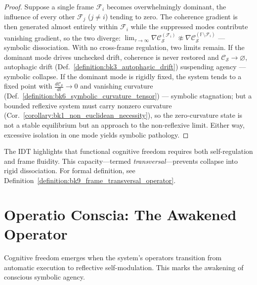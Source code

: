 \begin{proof}
\label{proof:bk9_isolation_dissociation_theorem}
\leavevmode
Suppose a single frame $\mathcal{F}_i$ becomes overwhelmingly dominant, the influence of every other $\mathcal{F}_j$ ($j\neq i$) tending to zero. The coherence gradient is then generated almost entirely within $\mathcal{F}_i$ while the suppressed modes contribute vanishing gradient, so the two diverge: $\lim_{\tau\to\infty}\nabla\mathcal{C}_{\mathcal{S}}^{(\mathcal{F}_i)}\not\approx\nabla\mathcal{C}_{\mathcal{S}}^{(\mathbb{F}\setminus\mathcal{F}_i)}$ --- symbolic dissociation. With no cross-frame regulation, two limits remain. If the dominant mode drives unchecked drift, coherence is never restored and $\mathcal{C}_{\mathcal{S}}\to\varnothing$, autophagic drift (Def.~\ref{definition:bk3_autophagic_drift}) suspending agency --- symbolic collapse. If the dominant mode is rigidly fixed, the system tends to a fixed point with $\tfrac{d\mathcal{C}_{\mathcal{S}}}{dt}\to0$ and vanishing curvature (Def.~\ref{definition:bk6_symbolic_curvature_tensor}) --- symbolic stagnation; but a bounded reflexive system must carry nonzero curvature (Cor.~\ref{corollary:bk1_non_euclidean_necessity}), so the zero-curvature state is not a stable equilibrium but an approach to the non-reflexive limit. Either way, excessive isolation in one mode yields symbolic pathology.
\end{proof}
\begin{remark}[Transversal]
\label{remark:bk9_transversal}
The IDT highlights that functional cognitive freedom  
requires both self-regulation and frame fluidity.
This capacity—termed \emph{transversal}—prevents collapse into rigid dissociation.
For formal definition, see Definition~\ref{definition:bk9_frame_transversal_operator}.
\end{remark}
\section{Operatio Conscia: The Awakened Operator}
\label{sec:bk9_operatio_conscia}
Cognitive freedom emerges when the system's operators transition from automatic execution to reflective self-modulation. This marks the awakening of conscious symbolic agency.
